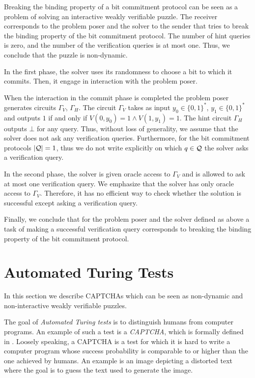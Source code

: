 Breaking the binding property of a bit commitment protocol can be seen as a problem of solving
an interactive weakly verifiable puzzle.
The receiver corresponds to the problem poser and the solver to the sender that tries to break the binding property of the bit commitment protocol.
The number of hint queries is zero, and the number of the verification queries is at most one. Thus, we conclude that the puzzle is non-dynamic.

In the first phase, the solver uses its randomness to choose a bit to which it commits. Then, it engage in interaction with the problem poser.

When the interaction in the commit phase is completed the problem poser generates circuits $\Gamma_V$, $\Gamma_H$.
The circuit $\Gamma_V$ takes as input $y_0 \in \{0,1\}^{*}$, $y_1 \in \{0,1\}^{*}$ and outputs $1$
if and only if $V(0,y_0) = 1 \land V(1,y_1) = 1$. The hint circuit $\Gamma_H$ outputs $\bot$ for any query.
Thus, without loss of generality, we assume that the solver does not ask any verification queries.
Furthermore, for the bit commitment protocols $|\mathcal{Q}| = 1$, thus we do not write explicitly on which $q \in \mathcal{Q}$ the solver asks a verification query.

In the second phase, the solver is given oracle access to $\Gamma_V$ and is allowed to ask at most one verification query.
We emphasize that the solver has only oracle access to $\Gamma_V$. Therefore, it has no efficient way to check whether
the solution is successful except asking a verification query.

Finally, we conclude that for the problem poser and the solver defined as above a task of making a successful verification query
corresponds to breaking the binding property of the bit commitment protocol.

\section{Automated Turing Tests}
\label{section:att}
In this section we describe CAPTCHAs which can be seen as non-dynamic
and non-interactive weakly verifiable puzzles.

The goal of \textit{Automated Turing tests} is to distinguish humans from computer programs.
An example of such a test is a \textit{CAPTCHA}, which is formally defined in \cite{von2003captcha}.
Loosely speaking, a CAPTCHA is a test for which it is hard to write a computer program whose success
probability is comparable to or higher than the one achieved by humans. An example is an image
depicting a distorted text where the goal is to guess the text used to generate the image.

